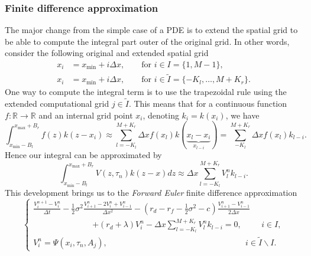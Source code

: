 \subsubsection{Finite difference approximation}
The major change from the simple case of a PDE is to extend the spatial grid to be able to compute the integral part outer of the original grid. In other words, consider the following original and extended spatial grid
\begin{align*}
x_i &= x_{\min}+ i\Delta x, \qquad\text{for } i \in I = \{1,M-1\},\\
x_i &= x_{\min}+i\Delta x, \qquad\text{for } i \in \tilde{I}=\{-K_l, \ldots, M + K_r\}.
\end{align*}
One way to compute the integral term is to use the trapezoidal rule using the extended computational grid $j\in \tilde{I}$. This means that for a continuous function $f:\mathbb{R}\to\mathbb{R}$ and an internal grid point $x_i$, denoting $k_i= k(x_i)$, we have
$$\int_{x_{\min}-B_l}^{x_{\max}+B_r} f(z) k(z-x_i) \approx \sum_{l=-K_l}^{M+K_r}\Delta x f(x_l)k(\underbrace{x_l-x_i}_{x_{l-i}})=\sum_{-K_l}^{M+K_r}\Delta x f(x_l)k_{l-i}.$$
Hence our integral can be approximated by
$$\int_{x_{\min}-B_l}^{x_{\max}+B_r} V(z,\tau_n)k(z-x)dz\approx \Delta x \sum_{l=-K_l}^{M+K_r} V^n_l k_{l-i}.$$
This development brings us to the \textit{Forward Euler} finite difference approximation
$$\begin{cases}
\displaystyle{\frac{V_i^{n+1}-V_i^n}{\Delta t}-\frac{1}{2}\sigma^2\frac{V_{i+1}^n-2V_i^n+V_{i-1}^n}{\Delta x^2}-\left(r_d-r_f-\frac{1}{2}\sigma^2-c\right)\frac{V_{i+1}^n-V_{i-1}^n}{2\Delta x}} \\
\hspace{3cm}\displaystyle{+(r_d + \lambda) V_i^n
-\Delta x \sum_{l=-K_l}^{M+K_r}V_l^nk_{l-i} = 0}, \hspace{1cm} i \in I,\\
V_i^n = \Psi(x_i,\tau_n,A_j), \hspace{7cm} i\in\tilde{I}\backslash I.
\end{cases}$$

